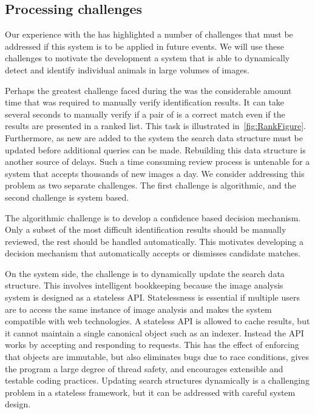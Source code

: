    \subsection{Processing challenges}
        Our experience with the \GZCFull{} has highlighted a number of
          challenges that must be addressed if this system is to be applied in
          future events.
        We will use these challenges to motivate the development a system that
          is able to dynamically detect and identify individual animals in large
          volumes of images.

        Perhaps the greatest challenge faced during the \GZC{} was the
          considerable amount time that was required to manually verify
          identification results.
        It can take several seconds to manually verify if a pair of \annots{}
          is a correct match even if the results are presented in a ranked list.
        This task is illustrated in~\cref{fig:RankFigure}.
        Furthermore, as new \exemplars{} are added to the system the search
          data structure must be updated before additional queries can be made.
        Rebuilding this data structure is another source of delays.
        Such a time consuming review process is untenable for a system that
          accepts thousands of new images a day.
        We consider addressing this problem as two separate challenges.
        The first challenge is algorithmic, and the second challenge is system
          based.

        The algorithmic challenge is to develop a confidence based decision
          mechanism.
        Only a subset of the most difficult identification results should be
          manually reviewed, the rest should be handled automatically.
        This motivates developing a decision mechanism that automatically
          accepts or dismisses candidate matches.

        On the system side, the challenge is to dynamically update the search
          data structure.
        This involves intelligent bookkeeping because the image analysis
          system is designed as a stateless API{}.
        Statelessness is essential if multiple users are to access the same
          instance of image analysis and makes the system compatible with web
          technologies.
        A stateless API is allowed to cache results, but it cannot maintain a
          single canonical object such as an indexer.
        Instead the API{} works by accepting and responding to requests.
        This has the effect of enforcing that objects are immutable, but also
          eliminates bugs due to race conditions, gives the program a large
          degree of thread safety, and encourages extensible and testable coding
          practices.
        Updating search structures dynamically is a challenging problem in a
          stateless framework, but it can be addressed with careful system
          design.
              
